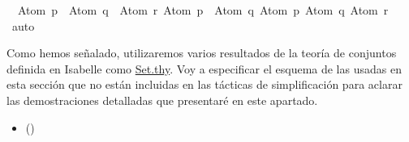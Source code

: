 \begin{isabellebody}
\ \ {\isacharbraceleft}{\isacharparenleft}Atom\ p\ \isactrlbold {\isasymrightarrow}\ Atom\ q{\isacharparenright}\ \isactrlbold {\isasymor}\ Atom\ r{\isacharcomma}\ Atom\ p\ \isactrlbold {\isasymrightarrow}\ Atom\ q{\isacharcomma}\ Atom\ p{\isacharcomma}\ Atom\ q{\isacharcomma}\ Atom\ r{\isacharbraceright}{\isachardoublequoteclose}\isanewline
%
\isadelimproof
\ \ %
\endisadelimproof
%
\isatagproof
{}\isamarkupfalse%
\ auto%
\endisatagproof
{\isafoldproof}%
%
\isadelimproof
%
\endisadelimproof
%
\begin{isamarkuptext}%
Como hemos señalado, utilizaremos varios resultados de la teoría de conjuntos definida en Isabelle
como \href{https://n9.cl/qatp}{Set.thy}.
Voy a especificar el esquema de las usadas en esta sección que no están incluidas en las tácticas de
simplificación para aclarar las demostraciones detalladas que presentaré en este apartado.\\
 \begin{itemize}
  \item[]  \hfill ()
  \end{itemize}


\end{isamarkuptext}
\end{isabellebody}
